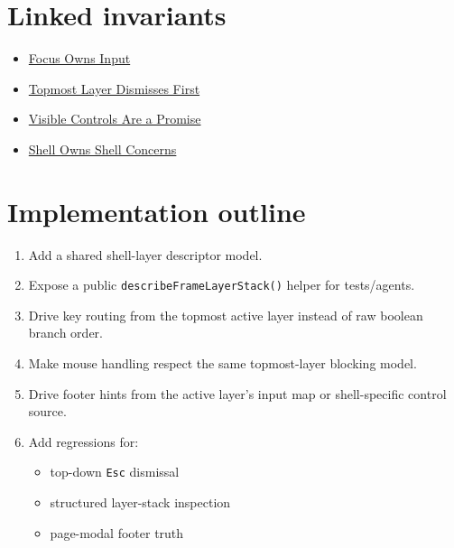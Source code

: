 

\section{Linked invariants}\label{record-255-linked-invariants}

\begin{itemize}
\tightlist
\item
  \href{https://github.com/flyingrobots/bijou/blob/cbd70612140e7a450d764b3c7be1c6af878b99bc/docs/invariants/focus-owns-input.md}{Focus Owns Input}
\item
  \href{https://github.com/flyingrobots/bijou/blob/cbd70612140e7a450d764b3c7be1c6af878b99bc/docs/invariants/topmost-layer-dismisses-first.md}{Topmost Layer Dismisses First}
\item
  \href{https://github.com/flyingrobots/bijou/blob/cbd70612140e7a450d764b3c7be1c6af878b99bc/docs/invariants/visible-controls-are-a-promise.md}{Visible Controls Are a Promise}
\item
  \href{https://github.com/flyingrobots/bijou/blob/cbd70612140e7a450d764b3c7be1c6af878b99bc/docs/invariants/shell-owns-shell-concerns.md}{Shell Owns Shell Concerns}
\end{itemize}

\section{Implementation outline}\label{record-255-implementation-outline}

\begin{enumerate}
\def\labelenumi{\arabic{enumi}.}
\tightlist
\item
  Add a shared shell-layer descriptor model.
\item
  Expose a public \texttt{d\allowbreak{}e\allowbreak{}s\allowbreak{}c\allowbreak{}r\allowbreak{}i\allowbreak{}b\allowbreak{}e\allowbreak{}F\allowbreak{}r\allowbreak{}a\allowbreak{}m\allowbreak{}e\allowbreak{}L\allowbreak{}a\allowbreak{}y\allowbreak{}e\allowbreak{}r\allowbreak{}S\allowbreak{}t\allowbreak{}a\allowbreak{}c\allowbreak{}k\allowbreak{}(\allowbreak{})} helper for tests/agents.
\item
  Drive key routing from the topmost active layer instead of raw boolean branch order.
\item
  Make mouse handling respect the same topmost-layer blocking model.
\item
  Drive footer hints from the active layer's input map or shell-specific control source.
\item
  Add regressions for:

  \begin{itemize}
  \tightlist
  \item
    top-down \texttt{E\allowbreak{}s\allowbreak{}c} dismissal
  \item
    structured layer-stack inspection
  \item
    page-modal footer truth
  \end{itemize}
\end{enumerate}

